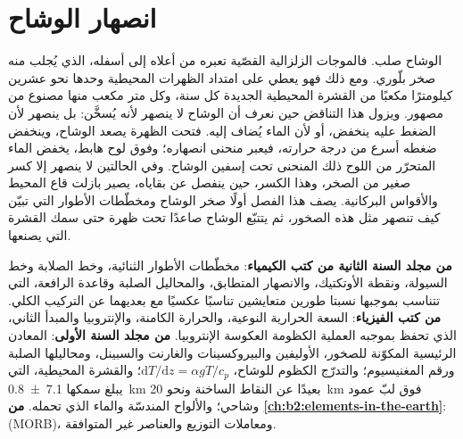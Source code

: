 \chapter{انصهار الوشاح}\label{ch:b2:mantle-melting}

الوشاح صلب. فالموجات الزلزالية القصّية تعبره من أعلاه إلى أسفله،
 الذي يُجلب منه صخر بلّوري. ومع ذلك فهو يعطي على امتداد الظهرات
المحيطية وحدها نحو عشرين كيلومترًا مكعبًا من القشرة المحيطية الجديدة كل سنة،
وكل متر مكعب منها مصنوع من مصهور. ويزول هذا التناقض حين نعرف
أن الوشاح لا ينصهر لأنه يُسخَّن: بل ينصهر لأن الضغط
عليه ينخفض، أو لأن الماء يُضاف إليه. فتحت الظهرة يصعد
الوشاح، وينخفض ضغطه أسرع من درجة حرارته، فيعبر
منحنى انصهاره؛ وفوق لوح هابط، يخفض الماء المتحرّر من اللوح ذلك
المنحنى تحت إسفين الوشاح. وفي الحالتين لا ينصهر إلا كسر صغير من الصخر،
وهذا الكسر، حين ينفصل عن بقاياه، يصير بازلت
قاع المحيط والأقواس البركانية. يصف هذا الفصل أولًا صخر الوشاح
ومخطّطات الأطوار التي تبيّن كيف تنصهر مثل هذه الصخور، ثم يتتبّع
الوشاح صاعدًا تحت ظهرة حتى سمك القشرة التي يصنعها.

\begin{recall}
\textbf{من مجلد السنة الثانية من كتب الكيمياء}: مخطّطات الأطوار الثنائية،
وخط الصلابة وخط السيولة، ونقطة الأوتكتيك، والانصهار المتطابق، والمحاليل الصلبة
وقاعدة الرافعة، التي تتناسب بموجبها نسبتا طورين متعايشين
تناسبًا عكسيًا مع بعديهما عن التركيب الكلي.
\textbf{من كتب الفيزياء}: السعة الحرارية النوعية، والحرارة الكامنة، والإنتروبيا
والمبدأ الثاني، الذي تحفظ بموجبه العملية الكظومة العكوسة الإنتروبيا.
\textbf{من مجلد السنة الأولى}: المعادن الرئيسية المكوّنة للصخور، الأوليفين
والبيروكسينات والغارنت والسبينل، ومحاليلها الصلبة ورقم المغنيسيوم؛
والتدرّج الكظوم للوشاح، $\mathrm dT/\mathrm dz = \alpha gT/c_p$؛ والقشرة المحيطية،
التي يبلغ سمكها \qty[uncertainty-mode=separate]{7.1 \pm 0.8}{km} بعيدًا عن النقاط الساخنة
ونحو \qty{20}{km} فوق لبّ عمود وشاحي؛ والألواح المندسّة والماء الذي
تحمله. \textbf{من \cref{ch:b2:elements-in-the-earth}}: 
(MORB)، ومعاملات التوزيع والعناصر غير المتوافقة.
\end{recall}

